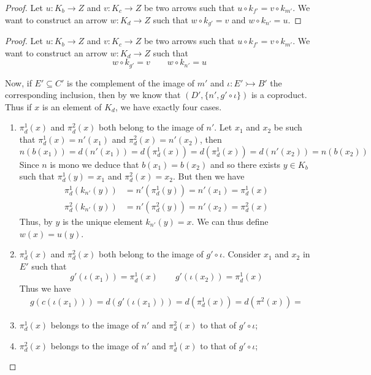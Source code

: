 \documentclass[a4paper,UKenglish,cleveref,pdftex,thm-restate,numberwithinsect]{lipics-v2021}
\newcommand{\mto}{\rightarrowtail}
\begin{document}
\begin{proof}
	
	
	
	
	Let $u\colon K_b\to Z$ and $v\colon K_c\to Z$ be two arrows such that $u\circ k_{f'}=v\circ k_{m'}$. We want to construct an arrow $w\colon K_d\to Z$ such that $w\circ k_{g'}=v$ and $w\circ k_{n'}=u$.
	
	
\end{proof}


\begin{proof} 
	Let $u\colon K_b\to Z$ and $v\colon K_c\to Z$ be two arrows such that $u\circ k_{f'}=v\circ k_{m'}$. We want to construct an arrow $w\colon K_d\to Z$ such that 
	\[w\circ k_{g'}=v \qquad w\circ k_{n'}=u\] 
	
	Now, if $E'\subseteq C'$ is the complement of the image of $m'$ and $\iota\colon E'\mto B'$ the corresponding inclusion, then by  we know that $(D', \{n', g'\circ \iota\})$ is a coproduct. Thus if $x$ is an element of $K_d$, we have exactly four cases.
	
	\begin{enumerate}
		\item $\pi^1_d(x)$ and $\pi^2_d(x)$ both belong to the image of $n'$. Let $x_1$ and $x_2$ be such that $\pi^1_d(x)=n'(x_1)$ and $\pi^2_d(x)=n'(x_2)$, then 
		\[n(b(x_1))=d(n'(x_1))=d(\pi^1_d(x))=d(\pi^1_d(x))=d(n'(x_2))=n(b(x_2)) \]
		Since $n$ is mono we deduce that $b(x_1)=b(x_2)$ and so there exists $y\in K_{b}$ such that $\pi^1_d(y)=x_1$ and $\pi^2_d(x)=x_2$. But then we have
		\begin{align*}
	\pi^1_d(k_{n'}(y))&=n'(\pi^1_d(y)) =n'(x_1)=\pi^1_d(x)\\
	\pi^2_d(k_{n'}(y))&=n'(\pi^2_d(y)) =n'(x_2)=\pi^2_d(x)
		\end{align*}
		Thus, by  $y$ is the unique element $k_{n'}(y)=x$. We can thus define $w(x)=u(y)$. 
		\item $\pi^1_d(x)$ and $\pi^2_d(x)$ both belong to the image of $g'\circ \iota$. Consider $x_1$ and $x_2$ in $E'$ such that
		\[g'(\iota(x_1))=\pi^1_d(x) \qquad  g'(\iota(x_2))=\pi^1_d(x)\]
		Thus we have
		\begin{align*}
			g(c(\iota(x_1)))=d(g'(\iota(x_1)))=d(\pi^1_d(x))=d(\pi^2(x))=
		\end{align*}
		
		\item $\pi^1_d(x)$ belongs to the image of $n'$  and $\pi^2_d(x)$ to that of $g'\circ \iota$;
		\item $\pi^2_d(x)$ belongs to the image of $n'$  and $\pi^1_d(x)$ to that of $g'\circ \iota$;
	\end{enumerate} 


\end{proof}
\end{document}
